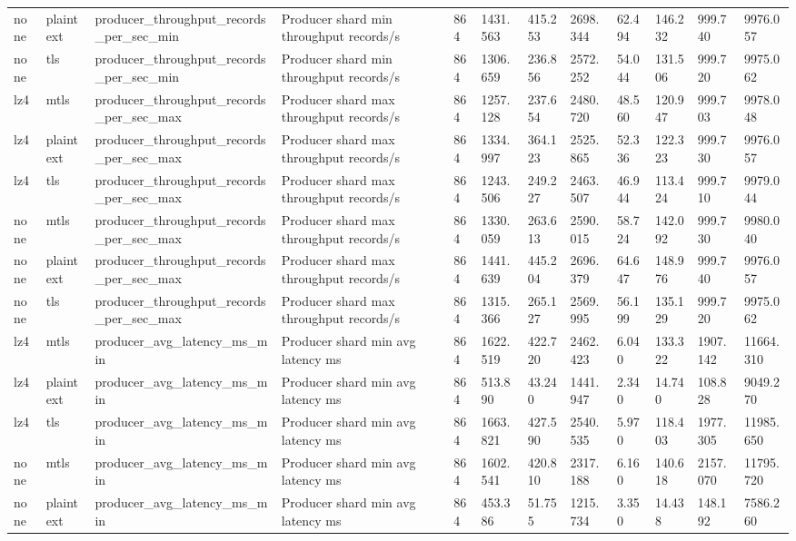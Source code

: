 \begin{longtable}{llllllllllll}
none & plaintext & producer\_throughput\_records\_per\_sec\_min & Producer shard min throughput records/s & 864 & 1431.563 & 415.253 & 2698.344 & 62.494 & 146.232 & 999.740 & 9976.057 \\
none & tls & producer\_throughput\_records\_per\_sec\_min & Producer shard min throughput records/s & 864 & 1306.659 & 236.856 & 2572.252 & 54.044 & 131.506 & 999.720 & 9975.062 \\
lz4 & mtls & producer\_throughput\_records\_per\_sec\_max & Producer shard max throughput records/s & 864 & 1257.128 & 237.654 & 2480.720 & 48.560 & 120.947 & 999.703 & 9978.048 \\
lz4 & plaintext & producer\_throughput\_records\_per\_sec\_max & Producer shard max throughput records/s & 864 & 1334.997 & 364.123 & 2525.865 & 52.336 & 122.323 & 999.730 & 9976.057 \\
lz4 & tls & producer\_throughput\_records\_per\_sec\_max & Producer shard max throughput records/s & 864 & 1243.506 & 249.227 & 2463.507 & 46.944 & 113.424 & 999.710 & 9979.044 \\
none & mtls & producer\_throughput\_records\_per\_sec\_max & Producer shard max throughput records/s & 864 & 1330.059 & 263.613 & 2590.015 & 58.724 & 142.092 & 999.730 & 9980.040 \\
none & plaintext & producer\_throughput\_records\_per\_sec\_max & Producer shard max throughput records/s & 864 & 1441.639 & 445.204 & 2696.379 & 64.647 & 148.976 & 999.740 & 9976.057 \\
none & tls & producer\_throughput\_records\_per\_sec\_max & Producer shard max throughput records/s & 864 & 1315.366 & 265.127 & 2569.995 & 56.199 & 135.129 & 999.720 & 9975.062 \\
lz4 & mtls & producer\_avg\_latency\_ms\_min & Producer shard min avg latency ms & 864 & 1622.519 & 422.720 & 2462.423 & 6.040 & 133.322 & 1907.142 & 11664.310 \\
lz4 & plaintext & producer\_avg\_latency\_ms\_min & Producer shard min avg latency ms & 864 & 513.890 & 43.240 & 1441.947 & 2.340 & 14.740 & 108.828 & 9049.270 \\
lz4 & tls & producer\_avg\_latency\_ms\_min & Producer shard min avg latency ms & 864 & 1663.821 & 427.590 & 2540.535 & 5.970 & 118.403 & 1977.305 & 11985.650 \\
none & mtls & producer\_avg\_latency\_ms\_min & Producer shard min avg latency ms & 864 & 1602.541 & 420.810 & 2317.188 & 6.160 & 140.618 & 2157.070 & 11795.720 \\
none & plaintext & producer\_avg\_latency\_ms\_min & Producer shard min avg latency ms & 864 & 453.386 & 51.755 & 1215.734 & 3.350 & 14.438 & 148.192 & 7586.260 \\

\end{longtable}
